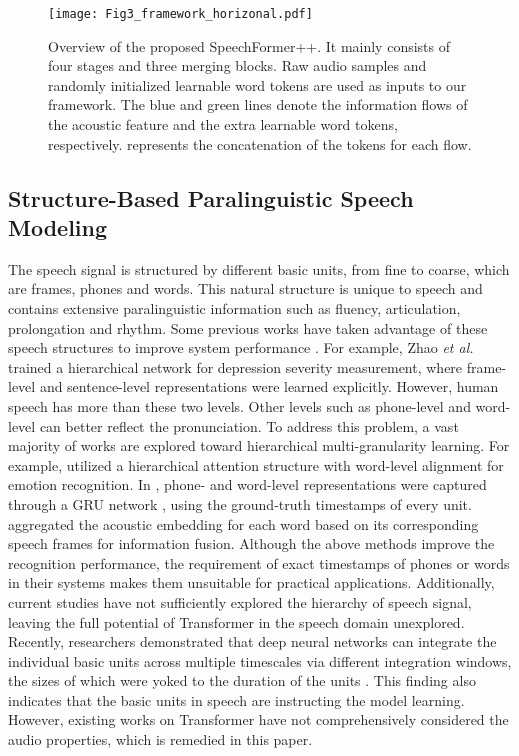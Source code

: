 \documentclass[lettersize,journal]{IEEEtran}
\begin{document}
\begin{figure*}[th]
\centering
\texttt{[image: Fig3\_framework\_horizonal.pdf]}
\caption{Overview of the proposed SpeechFormer++. It mainly consists of four stages and three merging blocks. Raw audio samples and randomly initialized learnable word tokens are used as inputs to our framework. The blue and green lines denote the information flows of the acoustic feature and the extra learnable word tokens, respectively.  represents the concatenation of the tokens for each flow.}
\label{fig_3}
\end{figure*}

\subsection{Structure-Based Paralinguistic Speech Modeling}
The speech signal is structured by different basic units, from fine to coarse, which are frames, phones and words. This natural structure is unique to speech and contains extensive paralinguistic information such as fluency, articulation, prolongation and rhythm. Some previous works have taken advantage of these speech structures to improve system performance \cite{reviewer2_3, reviewer2_4, speech_nature1, speech_nature2, speechformer, speech_nature3}. For example, Zhao \textit{et al.} \cite{reviewer2_3}  trained a hierarchical network for depression severity measurement, where frame-level and sentence-level representations were learned explicitly. However, human speech has more than these two levels. Other levels such as phone-level and word-level can better reflect the pronunciation. To address this problem, a vast majority of works are explored toward hierarchical multi-granularity learning. For example, \cite{reviewer2_4} utilized a hierarchical attention structure with word-level alignment for emotion recognition. In \cite{speech_nature1}, phone- and word-level representations were captured through a GRU network \cite{gru}, using the ground-truth timestamps of every unit. \cite{speech_nature2} aggregated the acoustic embedding for each word based on its corresponding speech frames for information fusion. Although the above methods improve the recognition performance, the requirement of exact timestamps of phones or words in their systems makes them unsuitable for practical applications. Additionally, current studies have not sufficiently explored the hierarchy of speech signal, leaving the full potential of Transformer in the speech domain unexplored. Recently, researchers demonstrated that deep neural networks can integrate the individual basic units across multiple timescales via different integration windows, the sizes of which were yoked to the duration of the units \cite{yoked}. This finding also indicates that the basic units in speech are instructing the model learning. However, existing works on Transformer have not comprehensively considered the audio properties, which is remedied in this paper.
\end{document}
